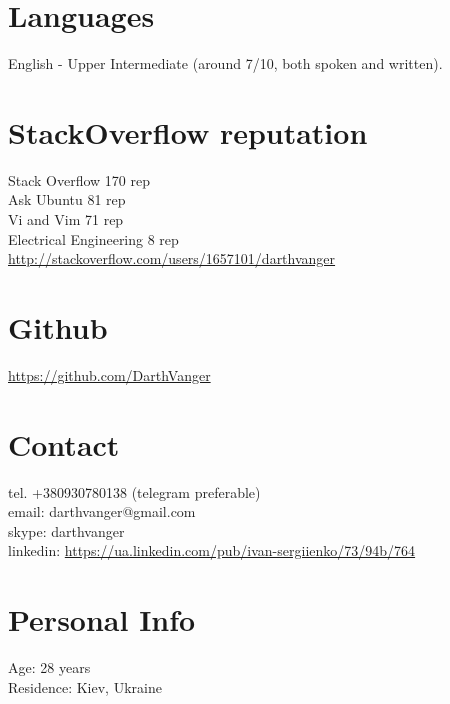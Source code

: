 \documentclass[a4paper, 14pt]{article}
\begin{document}
\section{Languages}
	English - Upper Intermediate (around 7/10, both spoken and written).

\section{StackOverflow reputation}
	Stack Overflow 170 rep \\
	Ask Ubuntu 81 rep \\
	Vi and Vim 71 rep \\
	Electrical Engineering 8 rep \\
  \url{http://stackoverflow.com/users/1657101/darthvanger}

\section{Github}
  \url{https://github.com/DarthVanger}

\section{Contact}
	tel. +380930780138 (telegram preferable) \\
	email: darthvanger@gmail.com \\
  skype: darthvanger \\
  linkedin: \url{https://ua.linkedin.com/pub/ivan-sergiienko/73/94b/764} \\
\section{Personal Info}
	Age: 28 years \\
	Residence: Kiev, Ukraine
\end{document}
